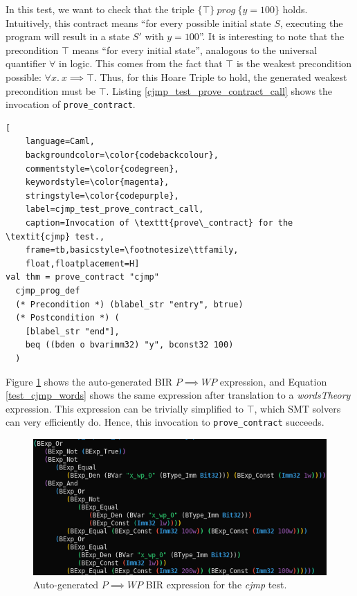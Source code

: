 \documentclass{kththesis}
\newcommand{\htriple}[3]{\ensuremath{\{#1\}~#2~\{#3\}}}
\newcommand{\WP}{\ensuremath{\mathit{WP}}}
\begin{document}
In this test, we want to check that the triple \htriple{\top}{prog}{y = 100} holds. Intuitively, this contract means ``for every possible initial state $S$, executing the program will result in a state $S'$ with $y=100$''. It is interesting to note that the precondition $\top$ means ``for every initial state'', analogous to the universal quantifier $\forall$ in logic. This comes from the fact that $\top$ is the weakest precondition possible: $\forall x.~x \implies \top$. Thus, for this Hoare Triple to hold, the generated weakest precondition must be $\top$. Listing \ref{cjmp_test_prove_contract_call} shows the invocation of \texttt{prove\_contract}.

\begin{lstlisting}[
    language=Caml,
    backgroundcolor=\color{codebackcolour},
    commentstyle=\color{codegreen},
    keywordstyle=\color{magenta},
    stringstyle=\color{codepurple},
    label=cjmp_test_prove_contract_call,
    caption=Invocation of \texttt{prove\_contract} for the \textit{cjmp} test.,
    frame=tb,basicstyle=\footnotesize\ttfamily,
    float,floatplacement=H]
val thm = prove_contract "cjmp"
  cjmp_prog_def
  (* Precondition *) (blabel_str "entry", btrue)
  (* Postcondition *) (
    [blabel_str "end"],
    beq ((bden o bvarimm32) "y", bconst32 100)
  )
\end{lstlisting}

Figure \ref{test_cjmp_bir} shows the auto-generated BIR $P \implies \WP$ expression, and Equation \ref{test_cjmp_words} shows the same expression after translation to a \textit{wordsTheory} expression. This expression can be trivially simplified to $\top$, which SMT solvers can very efficiently do. Hence, this invocation to \texttt{prove\_contract} succeeds.

\begin{figure}[!h]
	\includegraphics[width=\textwidth]{figures/test_cjmp_bir.png}
	\centering
	\caption{Auto-generated $P \implies \WP$ BIR expression for the \textit{cjmp} test.}
	\label{test_cjmp_bir}
\end{figure}
\end{document}
